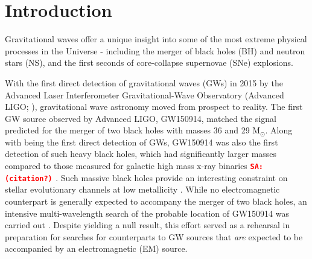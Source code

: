 \documentclass{aa}
\newcommand{\sa}[1]{{\textcolor{red}{\texttt{SA: #1}} }}
\begin{document}
{%
}
\maketitle

\section{Introduction}

Gravitational waves offer a unique insight into some of the most extreme physical processes in the Universe - including the merger of black holes (BH) and neutron stars (NS), and the first seconds of core-collapse supernovae (SNe) explosions. 

With the first direct detection of gravitational waves (GWs) in 2015 by the Advanced Laser Interferometer Gravitational-Wave
Observatory (Advanced LIGO; \citealp{FirstGW}), gravitational wave astronomy moved from prospect to reality. The first GW source observed by Advanced LIGO, GW150914, matched the signal predicted for the merger of two black holes with masses 36 and 29 M$_{\odot}$. Along with being the first direct detection of GWs, GW150914 was also the first detection of such heavy black holes, which had significantly larger masses compared to those measured for galactic high mass x-ray binaries {\bf \sa{(citation?)}}. Such massive black holes provide an interesting constraint on stellar evolutionary channels at low metallicity \citep[e.g.][]{FirstGW_astro, Belc16}. While no electromagnetic counterpart is generally expected to accompany the merger of two black holes, an intensive multi-wavelength search of the probable location of GW150914 was carried out \citep{FirstGW_EM}. Despite yielding a null result, this effort served as a rehearsal in preparation for searches for counterparts to GW sources that {\it are} expected to be accompanied by an 
electromagnetic (EM) source.
\end{document}
